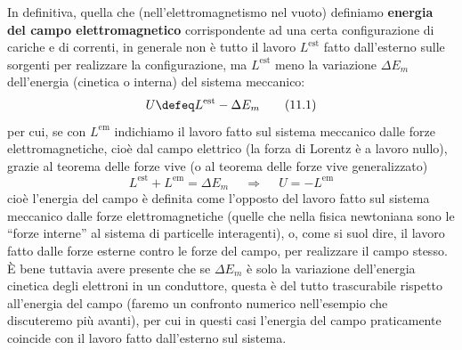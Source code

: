 In definitiva, quella che (nell'elettromagnetismo nel vuoto) definiamo
\textbf{energia del campo elettromagnetico} corrispondente ad una certa
configurazione di cariche e di correnti, in generale non \`e tutto il lavoro
$L^\mathrm{est}$ fatto dall'esterno sulle sorgenti per realizzare la
configurazione, ma $L^\mathrm{est}$ meno la variazione $\Delta E_m$ dell'energia
(cinetica o interna) del sistema meccanico:
\begin{equation}
  U\defeq L^\mathrm{est}-\Delta E_m
  \tag{11.1}
\end{equation}
per cui, se con $L^\mathrm{em}$ indichiamo il lavoro fatto sul sistema meccanico
dalle forze elettromagnetiche, cio\`e dal campo elettrico (la forza di Lorentz
\`e a lavoro nullo), grazie al teorema delle forze vive (o al teorema delle
forze vive generalizzato)
\begin{equation}
  L^\mathrm{est}+L^\mathrm{em}=\Delta E_m
  \quad\ \Rightarrow\quad\ U=-L^\mathrm{em}
  \tag{11.2}
\end{equation}
cio\`e l'energia del campo \`e definita come l'opposto del lavoro fatto sul
sistema meccanico dalle forze elettromagnetiche (quelle che nella fisica
newtoniana sono le ``forze interne'' al sistema di particelle interagenti), o,
come si suol dire, il lavoro fatto dalle forze esterne contro le forze del
campo, per realizzare il campo stesso.\\
\`E bene tuttavia avere presente che se $\Delta E_m$ \`e solo la variazione
dell'energia cinetica degli elettroni in un conduttore, questa \`e del tutto
trascurabile rispetto all'energia del campo (faremo un confronto numerico
nell'esempio che discuteremo pi\`u avanti), per cui in questi casi l'energia del
campo praticamente coincide con il lavoro fatto dall'esterno sul sistema.

